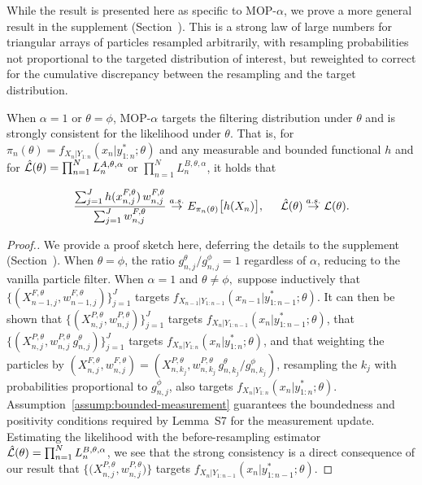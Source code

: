 \documentclass[11pt]{article}
\newcommand\arxiv[2]{#1} %
\begin{document}
While the result is presented here as specific to MOP-$\alpha$, we prove a more general result in the supplement (Section~\suppSecProofTriangularArrays).
This is a strong law of large numbers for triangular arrays of particles resampled arbitrarily, with resampling probabilities not proportional to the targeted distribution of interest, but reweighted to correct for the cumulative discrepancy between the resampling and the target distribution.


\begin{thm}
    \label{thm:mop-targeting}
    When $\alpha=1$ or $\theta=\phi$, MOP-$\alpha$ targets the filtering distribution under $\theta$ and is strongly consistent for the likelihood under $\theta$. That is, for $\pi_n(\theta)=f_{X_{n}|Y_{1:n}}(x_n|y_{1:n}^* ; \theta)$ and any measurable and bounded functional $h$ and for $\hat{\mathcal{L}}(\theta) = \prod_{n=1}^N L_n^{A,\theta,\alpha}$ or $\prod_{n=1}^N L_n^{B,\theta,\alpha}$, it holds that
    \arxiv{}{\vspace*{-1.5mm}}
    \begin{equation} \nonumber
        \frac{\sum_{j=1}^J h(x_{n,j}^{F, \theta}) \, w_{n,j}^{F,\theta}}{\sum_{j=1}^J w_{n,j}^{F,\theta}} \stackrel{a.s.}{\to} E_{\pi_n(\theta)} \big[h(X_n)\big], \hspace{5mm} \hat\lik(\theta)  \stackrel{a.s.}{\to} \lik(\theta).
    \arxiv{}{\vspace*{-1.5mm}}
    \end{equation}
\end{thm}

\begin{proof}[Proof.]
    \setlength{\emergencystretch}{2em}
    We provide a proof sketch here, deferring the details to the supplement (Section~\suppSecProofTriangularArrays). 
    When $\theta=\phi$, the ratio ${g_{n,j}^\theta}/{g_{n,j}^\phi}=1$ regardless of $\alpha$, reducing to the vanilla particle filter.
    When $\alpha=1$ and $\theta\neq\phi,$ suppose inductively that $\{(X^{F,\theta}_{n-1,j},w^{F,\theta}_{n-1,j})\}_{j=1}^J$ targets $f_{X_{n-1}|Y_{1:n-1}}(x_{n-1}|y^*_{1:n-1};\theta)$.
    It can then be shown that $\{(X^{P,\theta}_{n,j},w^{P,\theta}_{n,j})\}_{j=1}^J$ targets $f_{X_{n}|Y_{1:n-1}}(x_{n}|y^*_{1:n-1};\theta)$, that $\{(X^{P,\theta}_{n,j},w^{P,\theta}_{n,j} \, g^\theta_{n,j} )\}_{j=1}^J$ targets  $f_{X_{n}|Y_{1:n}}(x_{n}|y^*_{1:n};\theta)$, and that weighting the particles by $(X^{F,\theta}_{n,j},w^{F,\theta}_{n,j}) = (X^{P,\theta}_{n,k_j}, w^{P,\theta}_{n,k_j} \, g^\theta_{n,k_j} \big/ g^\phi_{n,k_j})$,
    resampling the $k_j$ with probabilities proportional to $g^\phi_{n,j}$, also targets $f_{X_{n}|Y_{1:n}}(x_{n}|y^*_{1:n};\theta)$.
    Assumption~\ref{assump:bounded-measurement} guarantees the boundedness and positivity conditions required by Lemma~S7 for the measurement update.
    Estimating the likelihood with the before-resampling estimator $\hat{\mathcal{L}}(\theta) = \prod_{n=1}^N L_n^{B,\theta,\alpha}$, we see that the strong consistency is a direct consequence of our result that $\{ \big(X^{P,\theta}_{n,j},w^{P,\theta}_{n,j}\big) \}$ targets $f_{X_{n}|Y_{1:n-1}}(x_{n}|y^*_{1:n-1};\theta)$. 
\end{proof}
\end{document}
